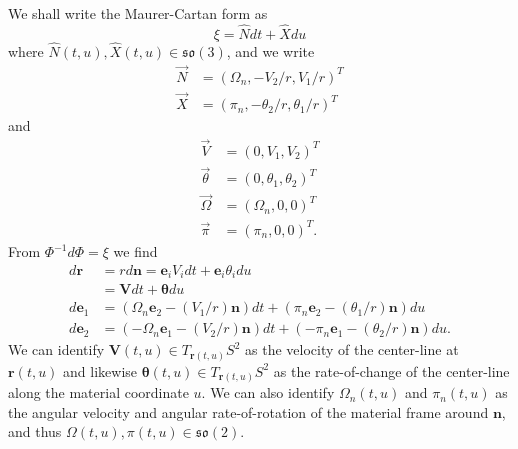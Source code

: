 We shall write the Maurer-Cartan form as
\begin{equation}
\xi = \hat{N} dt + \hat{X} du
\end{equation}
where $\hat{N}(t,u), \hat{X}(t,u) \in \mathfrak{so}(3)$, and we write
\begin{subequations}
\begin{align}
\vec{N} & = (\Omega_n, -V_2/r, V_1/r)^T \\
\vec{X} & = (\pi_n, -\theta_2/r, \theta_1/r)^T 
\end{align}
\end{subequations}
and
\begin{subequations}
\begin{align}
\vec{V} & = (0, V_1, V_2)^T \\
\vec{\theta} & = (0, \theta_1, \theta_2)^T \\
\vec{\Omega} & = (\Omega_n, 0, 0)^T \\
\vec{\pi} & = (\pi_n, 0, 0)^T.
\end{align}
\end{subequations}
From $\Phi^{-1} d \Phi = \xi$ we find
\begin{subequations}
\begin{align}
d \mathbf{r} & = r d \mathbf{n} = \mathbf{e}_i V_i dt + \mathbf{e}_i \theta_i du \\ 
 & = \mathbf{V} dt + \boldsymbol{\theta} du \nonumber \\
d \mathbf{e}_1 & = (\Omega_n \mathbf{e}_2 - (V_1/r) \mathbf{n}) dt + (\pi_n \mathbf{e}_2 - (\theta_1/r) \mathbf{n}) du \\
d \mathbf{e}_2 & = (-\Omega_n \mathbf{e}_1 - (V_2/r) \mathbf{n}) dt + (-\pi_n \mathbf{e}_1 - (\theta_2/r) \mathbf{n}) du.
\end{align}
\end{subequations}
We can identify $\mathbf{V}(t,u) \in T_{\mathbf{r}(t,u)} S^2$ as the velocity of the center-line at $\mathbf{r}(t,u)$ and likewise $\boldsymbol{\theta}(t,u) \in T_{\mathbf{r}(t,u)} S^2$ as the rate-of-change of the center-line along the material coordinate $u$. We can also identify $\Omega_n(t,u)$ and $\pi_n(t,u)$ as the angular velocity and angular rate-of-rotation of the material frame around $\mathbf{n}$, and thus $\Omega(t,u),  \pi(t,u) \in \mathfrak{so}(2)$.

